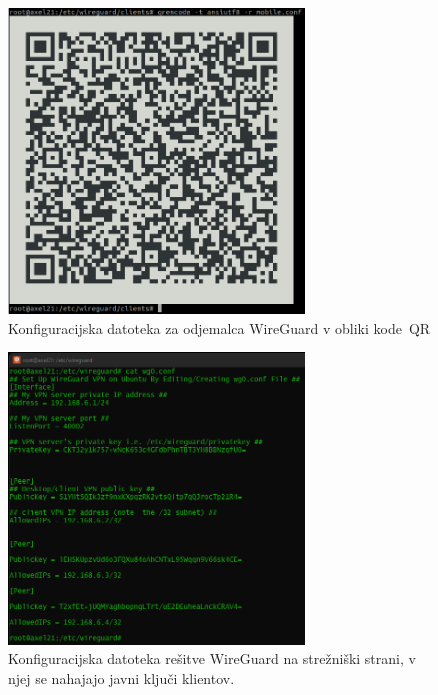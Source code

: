 \documentclass[a4paper, 12pt]{book}
\begin{document}
\begin{figure}[H]
\begin{center}
\includegraphics[width=0.7\textwidth]{fotografije/qrWG.png}
\end{center}
\caption{Konfiguracijska datoteka za odjemalca WireGuard v obliki \mbox{kode QR} \cite{rvidmar}}
\label{wg_client_qr}
\end{figure}

\begin{figure}[H]
\begin{center}
\includegraphics[width=0.7\textwidth]{fotografije/wg_config.png}
\end{center}
\caption{Konfiguracijska datoteka rešitve WireGuard na strežniški strani, v njej se nahajajo javni ključi klientov. \cite{rvidmar}}
\label{wg_config}
\end{figure}
\end{document}
